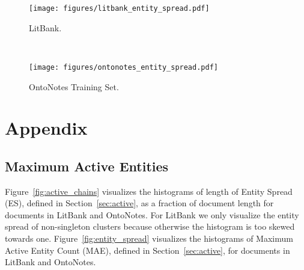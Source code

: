 \documentclass[11pt,a4paper]{article}
\begin{document}
\begin{figure*}[h]
\centering
\begin{subfigure}[b]{0.45\textwidth}
        \centering
        \texttt{[image: figures/litbank\_entity\_spread.pdf]}
        \caption{LitBank.}
        \label{fig:litbank_spread}
    \end{subfigure}~
    \begin{subfigure}[b]{0.45\textwidth}
        \centering
        \texttt{[image: figures/ontonotes\_entity\_spread.pdf]}
        \caption{OntoNotes Training Set.}
        \label{fig:ontonotes_spread}
    \end{subfigure}
    \caption{Histograms of Entity Spread as fraction of document length for LitBank and OntoNotes.}
    \label{fig:entity_spread}
\end{figure*}
 


\newpage



\appendix
\section{Appendix}



\subsection{Maximum Active Entities}
Figure~\ref{fig:active_chains} visualizes the histograms of length of Entity Spread (ES), defined in Section~\ref{sec:active},  as a fraction of document length for documents in LitBank and OntoNotes. For LitBank we only visualize the entity spread of non-singleton clusters because otherwise the histogram is too skewed towards one.
Figure~\ref{fig:entity_spread} visualizes the histograms of Maximum Active Entity Count (MAE), defined in Section~\ref{sec:active}, for documents in LitBank and OntoNotes.




\begin{table}[!ht]

\end{table}
\end{document}
